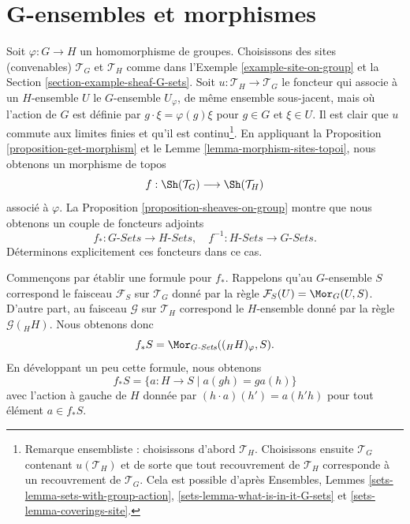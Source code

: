 \section{G-ensembles et morphismes}
\label{section-G-sets-morphisms}

\noindent
Soit $\varphi : G \to H$ un homomorphisme de groupes.
Choisissons des sites (convenables) $\mathcal{T}_G$ et $\mathcal{T}_H$ comme dans
l’Exemple \ref{example-site-on-group} et la
Section \ref{section-example-sheaf-G-sets}.
Soit $u : \mathcal{T}_H \to \mathcal{T}_G$ le foncteur qui associe
à un $H$-ensemble $U$ le $G$-ensemble $U_\varphi$, de même ensemble sous-jacent,
mais où l’action de $G$ est définie par $g \cdot \xi = \varphi(g)\xi$ pour
$g \in G$ et $\xi \in U$.
Il est clair que $u$ commute aux limites finies et qu’il est
continu\footnote{Remarque ensembliste : choisissons d’abord $\mathcal{T}_H$.
Choisissons ensuite $\mathcal{T}_G$ contenant $u(\mathcal{T}_H)$ et de sorte que
tout recouvrement de $\mathcal{T}_H$ corresponde à un recouvrement de
$\mathcal{T}_G$. Cela est possible d’après
Ensembles, Lemmes
\ref{sets-lemma-sets-with-group-action},
\ref{sets-lemma-what-is-in-it-G-sets} et
\ref{sets-lemma-coverings-site}.}.
En appliquant
la Proposition \ref{proposition-get-morphism}
et le
Lemme \ref{lemma-morphism-sites-topoi},
nous obtenons un morphisme de topos
$$
f : \Sh(\mathcal{T}_G) \longrightarrow \Sh(\mathcal{T}_H)
$$
associé à $\varphi$. La
Proposition \ref{proposition-sheaves-on-group}
montre que nous obtenons un couple de foncteurs adjoints
$$
f_* : G\textit{-Sets} \longrightarrow H\textit{-Sets}, \quad
f^{-1} : H\textit{-Sets} \longrightarrow G\textit{-Sets}.
$$
Déterminons explicitement ces foncteurs dans ce cas.

\medskip\noindent
Commençons par établir une formule pour $f_*$.
Rappelons qu’au $G$-ensemble $S$ correspond le faisceau
$\mathcal{F}_S$ sur $\mathcal{T}_G$ donné par la règle
$\mathcal{F}_S(U) = \Mor_G(U, S)$. D’autre part, au
faisceau $\mathcal{G}$ sur $\mathcal{T}_H$ correspond le $H$-ensemble
donné par la règle $\mathcal{G}({}_HH)$. Nous obtenons donc
$$
f_*S = \Mor_{G\textit{-Sets}}(({}_HH)_\varphi, S).
$$
En développant un peu cette formule, nous obtenons
$$
f_*S = \{ a : H \to S \mid a(gh) = ga(h) \}
$$
avec l’action à gauche de $H$ donnée par
$(h \cdot a)(h') = a(h'h)$
pour tout élément $a \in f_*S$.

